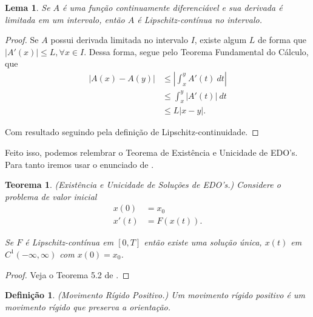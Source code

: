 \documentclass[11pt,letterpaper,twocolumn]{article}
\newtheorem{theorem}{Teorema}
\newtheorem{definition}{Definição}
\newtheorem{lemma}{Lema}
\begin{document}
\begin{lemma}
    \label{lipschitz-continua}
    Se $A$ é uma função continuamente diferenciável e sua derivada é limitada em um intervalo, então $A$ é Lipschitz-contínua no intervalo.
\end{lemma}

\begin{proof}
    Se $A$ possui derivada limitada no intervalo $I$, existe algum $L$ de forma que $|A'(x)|\leq L, \forall x\in I$. Dessa forma, segue pelo Teorema Fundamental do Cálculo, que
    \begin{equation*}
        \begin{split}
            \left|A(x) - A(y)\right| & \leq \left|\int_x^y A'(t) ~dt\right| \\
            & \leq \int_x^y \left|A'(t)\right| ~dt \\
            & \leq L \left|x - y\right|.
        \end{split}
    \end{equation*}
    
    Com resultado seguindo pela definição de Lipschitz-continuidade.
\end{proof}

Feito isso, podemos relembrar o Teorema de Existência e Unicidade de EDO's. Para tanto iremos usar o enunciado de \cite{cruz}.

\begin{theorem}(Existência e Unicidade de Soluções de EDO's.)
    \label{existencia_e_unicidade}
    Considere o problema de valor inicial
    \begin{equation*}
        \begin{split}
            x(0) & = x_0 \\
            x'(t) & = F(x(t)).
        \end{split}
    \end{equation*}
    
    Se $F$ é Lipschitz-contínua em $[0, T]$ então existe uma solução única, $x(t)$ em $C^1(-\infty, \infty)$ com $x(0) = x_0$.
\end{theorem}

\begin{proof}
    Veja o Teorema 5.2 de \cite{cruz}.
\end{proof}

\begin{definition}(Movimento Rígido Positivo.)
    Um movimento rígido positivo é um movimento rígido que preserva a orientação.
\end{definition}
\end{document}
